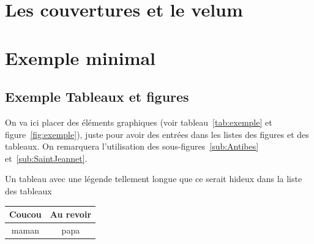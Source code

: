 		
		\section{Les couvertures et le velum}

		\section{Exemple minimal}
		
			\subsection{Exemple Tableaux et figures}
			On va ici placer des éléments graphiques (voir tableau~\ref{tab:exemple} et figure~\ref{fig:exemple}), juste pour avoir des entrées dans les listes des figures et des 	tableaux. On remarquera l'utilisation des sous-figures~\ref{sub:Antibes} et~\ref{sub:SaintJeannet}.
	
			\begin{tableth}
				\caption[Légende courte pour l'exemple de tableau]{Un tableau avec une légende tellement longue que ce serait hideux dans la liste des tableaux}
					\label{tab:exemple}
				\begin{tabular}{c|c}
					Coucou	& Au revoir\\
					\hline
					maman	& papa
				\end{tabular}
			\end{tableth}

